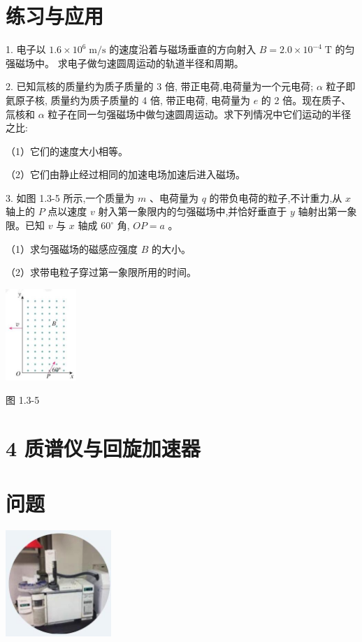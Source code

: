 \documentclass[10pt]{article}
\begin{document}
\section*{练习与应用}

1. 电子以 \({1.6} \times {10}^{6}\mathrm{\;m}/\mathrm{s}\) 的速度沿着与磁场垂直的方向射入 \(B = {2.0} \times {10}^{-4}\mathrm{\;T}\) 的匀强磁场中。 求电子做匀速圆周运动的轨道半径和周期。

2. 已知氚核的质量约为质子质量的 3 倍, 带正电荷,电荷量为一个元电荷; \(\alpha\) 粒子即氦原子核, 质量约为质子质量的 4 倍, 带正电荷, 电荷量为 \(e\) 的 2 倍。现在质子、氚核和 \(\alpha\) 粒子在同一匀强磁场中做匀速圆周运动。求下列情况中它们运动的半径之比:

（1）它们的速度大小相等。

（2）它们由静止经过相同的加速电场加速后进入磁场。

3. 如图 1.3-5 所示,一个质量为 \(m\) 、电荷量为 \(q\) 的带负电荷的粒子,不计重力,从 \(x\) 轴上的 \(P\) 点以速度 \(v\) 射入第一象限内的匀强磁场中,并恰好垂直于 \(y\) 轴射出第一象限。已知 \(v\) 与 \(x\) 轴成 \({60}^{ \circ }\) 角, \({OP} = a\) 。

（1）求匀强磁场的磁感应强度 \(B\) 的大小。

（2）求带电粒子穿过第一象限所用的时间。

\begin{center}
\includegraphics[max width=0.2\textwidth]{images/01910e72-c5b7-7ed5-a6d4-fb3a5faefc32_21_337275.jpg}
\end{center}

图 1.3-5

\section*{4 质谱仪与回旋加速器}

\section*{问题}

\begin{center}
\includegraphics[max width=0.3\textwidth]{images/01910e72-c5b7-7ed5-a6d4-fb3a5faefc32_22_732216.jpg}
\end{center}
\end{document}
